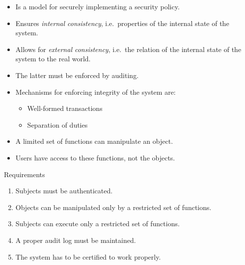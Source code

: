\begin{frame}
  \begin{idea}
    \begin{itemize}
      \item Is a model for securely implementing a security policy.

      \item Ensures \emph{internal consistency}, i.e.\ properties of the internal 
        state of the system.

      \item Allows for \emph{external consistency}, i.e.\ the relation of the 
        internal state of the system to the real world.

      \item The latter must be enforced by auditing.
    \end{itemize}
  \end{idea}
\end{frame}

\begin{frame}
  \begin{itemize}
    \item Mechanisms for enforcing integrity of the system are:
      \begin{itemize}
        \item Well-formed transactions

        \item Separation of duties
      \end{itemize}
  \end{itemize}

  \pause{}

  \begin{definition}
    \begin{itemize}
      \item A limited set of functions can manipulate an object.
      \item Users have access to these functions, not the objects.
    \end{itemize}
  \end{definition}
\end{frame}

\begin{frame}
  \begin{block}{Requirements}
    \begin{enumerate}
      \item Subjects must be authenticated.
      \item Objects can be manipulated only by a restricted set of functions.
      \item Subjects can execute only a restricted set of functions.
      \item A proper audit log must be maintained.
      \item The system has to be certified to work properly.
    \end{enumerate}
  \end{block}
\end{frame}

